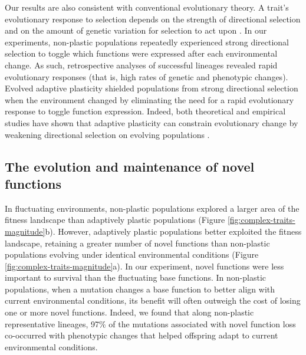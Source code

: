 \begin{raggedbottom}
Our results are also consistent with conventional evolutionary theory.
A trait's evolutionary response to selection depends on the strength of directional selection and on the amount of genetic variation for selection to act upon \citep{lande_measurement_1983,zimmer_evolution_2013}.
In our experiments, non-plastic populations repeatedly experienced strong directional selection to toggle which functions were expressed after each environmental change.
As such, retrospective analyses of successful lineages revealed rapid evolutionary responses (that is, high rates of genetic and phenotypic changes).
Evolved adaptive plasticity shielded populations from strong directional selection when the environment changed by eliminating the need for a rapid evolutionary response to toggle function expression.
Indeed, both theoretical and empirical studies have shown that adaptive plasticity can constrain evolutionary change by weakening directional selection on evolving populations \citep{price_role_2003,paenke_influence_2007,ghalambor_non-adaptive_2015}.


\subsection{The evolution and maintenance of novel functions}

In fluctuating environments, non-plastic populations explored a larger area of the fitness landscape than adaptively plastic populations (Figure \ref{fig:complex-traits-magnitude}b).
However, adaptively plastic populations better exploited the fitness landscape, retaining a greater number of novel functions than non-plastic populations evolving under identical environmental conditions (Figure \ref{fig:complex-traits-magnitude}a).
In our experiment, novel functions were less important to survival than the fluctuating base functions.
In non-plastic populations, when a mutation changes a base function to better align with current environmental conditions, its benefit will often outweigh the cost of losing one or more novel functions.
Indeed, we found that along non-plastic representative lineages, 97\% of the mutations associated with novel function loss co-occurred with phenotypic changes that helped offspring adapt to current environmental conditions.


\end{raggedbottom}
